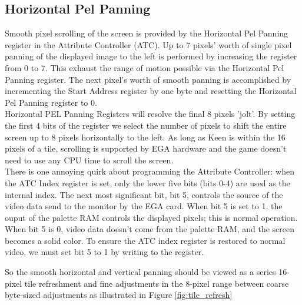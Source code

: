 \documentclass[book.tex]{subfiles}
\begin{document}
\subsection{Horizontal Pel Panning}
Smooth pixel scrolling of the screen is provided by the Horizontal Pel Panning register in the Attribute Controller (ATC). Up to 7 pixels' worth of single pixel panning of the displayed image to the left is performed by increasing the register from 0 to 7. This exhaust the range of motion possible via the Horizontal Pel Panning register. The next pixel's worth of smooth panning is accomplished by incrementing the Start Address register by one byte and resetting the Horizontal Pel Panning register to 0. \\

Horizontal PEL Panning Registers will resolve the final 8 pixels 'jolt'. By setting the first 4 bits of the register we select the number of pixels to shift the entire screen up to 8 pixels horizontally to the left. As long as Keen is within the 16 pixels of a tile, scrolling is supported by EGA hardware and the game doesn't need to use any CPU time to scroll the screen.\\

There is one annoying quirk about programming the Attribute Controller: when the ATC Index register is set, only the lower five bits (bits 0-4) are used as the internal index. The next most significant bit, bit 5, controls the source of the video data send to the monitor by the EGA card. When bit 5 is set to 1, the ouput of the palette RAM controls the displayed pixels; this is normal operation. When bit 5 is 0, video data doesn't come from the palette RAM, and the screen becomes a solid color. To ensure the ATC index register is restored to normal video, we must set bit 5 to 1 by writing  to the register.\\ 

\begin{minipage}{\textwidth}
  
  \end{minipage}
  \label{ega_pel_pan}
  \par

So the smooth horizontal and vertical panning should be viewed as a series 16-pixel tile refreshment and fine adjustments in the 8-pixel range between coarse byte-sized adjustments as illustrated in Figure \ref{fig:tile_refresh} 
\end{document}
